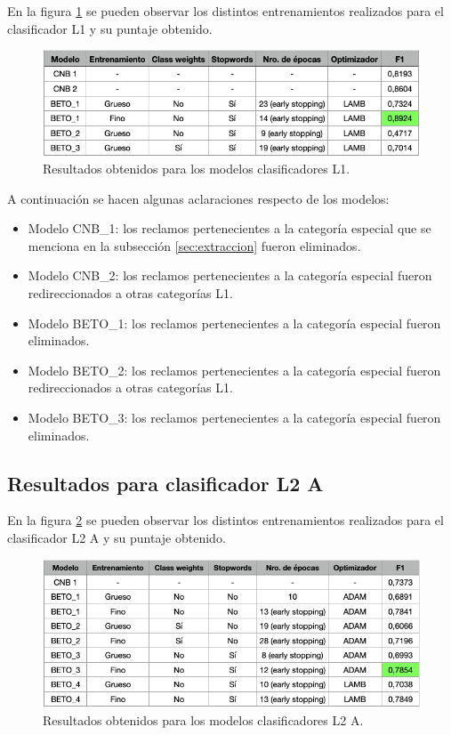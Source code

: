 En la figura \ref{fig:res-l1} se pueden observar los distintos entrenamientos realizados para el clasificador L1 y su puntaje obtenido.

\begin{figure}[htbp]
	\centering
	\includegraphics[width=1\textwidth]{./Figures/cap4-resultados-l1.png}
	\caption{Resultados obtenidos para los modelos clasificadores L1.}
	\label{fig:res-l1}
\end{figure}

A continuación se hacen algunas aclaraciones respecto de los modelos:
\begin{itemize}
	\item Modelo CNB\_1: los reclamos pertenecientes a la categoría especial que se menciona en la subsección \ref{sec:extraccion} fueron eliminados.
	\item Modelo CNB\_2: los reclamos pertenecientes a la categoría especial fueron redireccionados a otras categorías L1.
	\item Modelo BETO\_1: los reclamos pertenecientes a la categoría especial fueron eliminados.
	\item Modelo BETO\_2: los reclamos pertenecientes a la categoría especial fueron redireccionados a otras categorías L1.
	\item Modelo BETO\_3: los reclamos pertenecientes a la categoría especial fueron eliminados.
\end{itemize}

\subsection{Resultados para clasificador L2 A}

En la figura \ref{fig:res-l2a} se pueden observar los distintos entrenamientos realizados para el clasificador L2 A y su puntaje obtenido.

\begin{figure}[H]
	\centering
	\includegraphics[width=1\textwidth]{./Figures/cap4-resultados-l2a.png}
	\caption{Resultados obtenidos para los modelos clasificadores L2 A.}
	\label{fig:res-l2a}
\end{figure}


